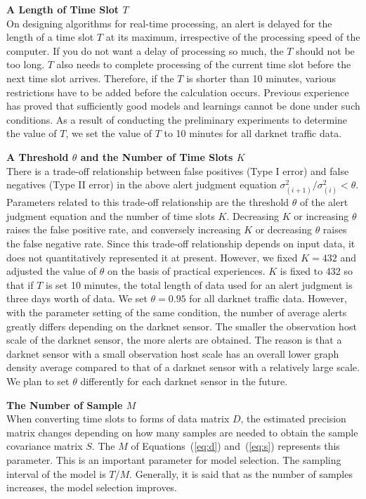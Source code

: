 \documentclass[letterpaper]{sig-alternate-10pt}
\begin{document}
\vspace*{0.3 cm}
\noindent
\textbf{A Length of Time Slot $T$}\\
On designing algorithms for real-time processing, an alert is delayed for the length of a time slot $T$ at its maximum, irrespective of the processing speed of the computer.
If you do not want a delay of processing so much, the $T$ should not be too long.
$T$ also needs to complete processing of the current time slot before the next time slot arrives.
Therefore, if the $T$ is shorter than 10 minutes, various restrictions have to be added before the calculation occurs.
Previous experience has proved that sufficiently good models and learnings cannot be done under such conditions.
As a result of conducting the preliminary experiments to determine the value of $T$, we set the value of $T$ to 10 minutes for all darknet traffic data.

\vspace*{0.3 cm}
\noindent
\textbf{A Threshold $\theta$ and the Number of Time Slots $K$}\\
There is a trade-off relationship between false positives (Type I error) and false negatives (Type I\hspace{-.1em}I error) in the above alert judgment equation $\sigma^{2}_{(i+1)}/\sigma^{2}_{(i)}<\theta$.
Parameters related to this trade-off relationship are the threshold $\theta$ of the alert judgment equation and the number of time slots $K$.
Decreasing $K$ or increasing $\theta$ raises the false positive rate, and conversely increasing $K$ or decreasing $\theta$ raises the false negative rate.
Since this trade-off relationship depends on input data, it does not quantitatively represented it at present.
However, we fixed $K = 432$ and adjusted the value of $\theta$ on the basis of practical experiences.
$K$ is fixed to 432 so that if $T$ is set 10 minutes, the total length of data used for an alert judgment is three days worth of data.
We set $\theta=0.95$ for all darknet traffic data.
However, with the parameter setting of the same condition, the number of average alerts greatly differs depending on the darknet sensor.
The smaller the observation host scale of the darknet sensor, the more alerts are obtained.
The reason is that a darknet sensor with a small observation host scale has an overall lower graph density average compared to that of a darknet sensor with a relatively large scale.
We plan to set $\theta$ differently for each darknet sensor in the future.


\vspace*{0.3 cm}
\noindent
\textbf{The Number of Sample $M$}\\
When converting time slots to forms of data matrix $D$, the estimated precision matrix changes depending on how many samples are needed to obtain the sample covariance matrix $S$.
The $M$ of Equations~(\ref{eq:d}) and~(\ref{eq:s}) represents this parameter.
This is an important parameter for model selection.
The sampling interval of the model is $T/M$.
Generally, it is said that as the number of samples increases, the model selection improves.
\end{document}
